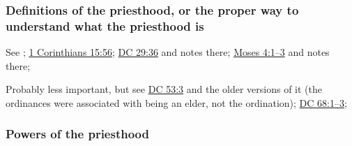 		
	\subsubsection{Definitions of the priesthood, or the proper way to understand what the priesthood is}
		\label{PRIESTHOOD-definition}
		
		See \hyperref[ANOMIA]{}; \hyperref[1CORINTHIANS-15-56]{1 Corinthians 15:56}; \hyperref[DC29-36]{DC 29:36} and notes there; \hyperref[MOSES-4-1]{Moses 4:1--3} and notes there; 
		
		Probably less important, but see \hyperref[DC53-3]{DC 53:3} and the older versions of it (the ordinances were associated with being an elder, not the ordination); \hyperref[DC68-1]{DC 68:1--3}; 
		
	\subsubsection{Powers of the priesthood}
		\label{PRIESTHOOD-powers}
	
